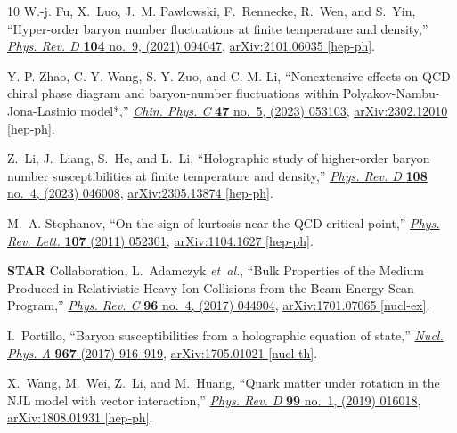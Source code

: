 \documentclass[a4paper,12pt]{article}
\numberwithin{equation}{section}
\begin{document}
\begin{thebibliography}{10}
	W.-j. Fu, X.~Luo, J.~M. Pawlowski, F.~Rennecke, R.~Wen, and S.~Yin,
	``{Hyper-order baryon number fluctuations at finite temperature and
		density},'' \href{http://dx.doi.org/10.1103/PhysRevD.104.094047}{{\em Phys.
			Rev. D} {\bfseries 104} no.~9, (2021) 094047},
	\href{http://arxiv.org/abs/2101.06035}{{\ttfamily arXiv:2101.06035
			[hep-ph]}}.
	
	Y.-P. Zhao, C.-Y. Wang, S.-Y. Zuo, and C.-M. Li, ``{Nonextensive effects on QCD
		chiral phase diagram and baryon-number fluctuations within
		Polyakov-Nambu-Jona-Lasinio model*},''
	\href{http://dx.doi.org/10.1088/1674-1137/acbf2a}{{\em Chin. Phys. C}
		{\bfseries 47} no.~5, (2023) 053103},
	\href{http://arxiv.org/abs/2302.12010}{{\ttfamily arXiv:2302.12010
			[hep-ph]}}.
	
	Z.~Li, J.~Liang, S.~He, and L.~Li, ``{Holographic study of higher-order baryon
		number susceptibilities at finite temperature and density},''
	\href{http://dx.doi.org/10.1103/PhysRevD.108.046008}{{\em Phys. Rev. D}
		{\bfseries 108} no.~4, (2023) 046008},
	\href{http://arxiv.org/abs/2305.13874}{{\ttfamily arXiv:2305.13874
			[hep-ph]}}.
	
	M.~A. Stephanov, ``{On the sign of kurtosis near the QCD critical point},''
	\href{http://dx.doi.org/10.1103/PhysRevLett.107.052301}{{\em Phys. Rev.
			Lett.} {\bfseries 107} (2011) 052301},
	\href{http://arxiv.org/abs/1104.1627}{{\ttfamily arXiv:1104.1627 [hep-ph]}}.
	
	{\bfseries STAR} Collaboration, L.~Adamczyk {\em et~al.}, ``{Bulk Properties of
		the Medium Produced in Relativistic Heavy-Ion Collisions from the Beam Energy
		Scan Program},'' \href{http://dx.doi.org/10.1103/PhysRevC.96.044904}{{\em
			Phys. Rev. C} {\bfseries 96} no.~4, (2017) 044904},
	\href{http://arxiv.org/abs/1701.07065}{{\ttfamily arXiv:1701.07065
			[nucl-ex]}}.
	
	I.~Portillo, ``{Baryon susceptibilities from a holographic equation of
		state},'' \href{http://dx.doi.org/10.1016/j.nuclphysa.2017.05.012}{{\em Nucl.
			Phys. A} {\bfseries 967} (2017) 916--919},
	\href{http://arxiv.org/abs/1705.01021}{{\ttfamily arXiv:1705.01021
			[nucl-th]}}.
	
	X.~Wang, M.~Wei, Z.~Li, and M.~Huang, ``{Quark matter under rotation in the NJL
		model with vector interaction},''
	\href{http://dx.doi.org/10.1103/PhysRevD.99.016018}{{\em Phys. Rev. D}
		{\bfseries 99} no.~1, (2019) 016018},
	\href{http://arxiv.org/abs/1808.01931}{{\ttfamily arXiv:1808.01931
			[hep-ph]}}.
	

\end{thebibliography}
\end{document}
